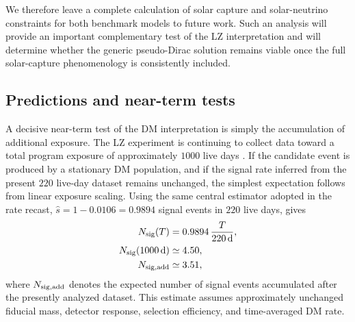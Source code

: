\documentclass[aps,prd,reprint,superscriptaddress,nofootinbib,longbibliography,floatfix]{revtex4-2}
\begin{document}
We therefore leave a complete calculation of solar capture and solar-neutrino constraints for both benchmark models to future work. Such an analysis will provide an important complementary test of the LZ interpretation and will determine whether the generic pseudo-Dirac solution remains viable once the full solar-capture phenomenology is consistently included.




\subsection{Predictions and near-term tests}

A decisive near-term test of the DM interpretation is simply the accumulation of additional exposure. The LZ experiment is continuing to collect data toward a total program exposure of approximately $1000$ live days \cite{LZWebsite2026}. If the candidate event is produced by a stationary DM population, and if the signal rate inferred from the present $220$ live-day dataset remains unchanged, the simplest expectation follows from linear exposure scaling. Using the same central estimator adopted in the rate recast, $\hat s=1-0.0106=0.9894$ signal events in $220$ live days, gives
\begin{align}
N_{\rm sig}(T)
&=
0.9894\,\frac{T}{220\,{\rm d}},
\\
N_{\rm sig}(1000\,{\rm d})
&\simeq
4.50,
\\
N_{\rm sig,add}
&\simeq
3.51,
\end{align}
where $N_{\rm sig,add}$ denotes the expected number of signal events accumulated after the presently analyzed dataset. This estimate assumes approximately unchanged fiducial mass, detector response, selection efficiency, and time-averaged DM rate.
\end{document}
